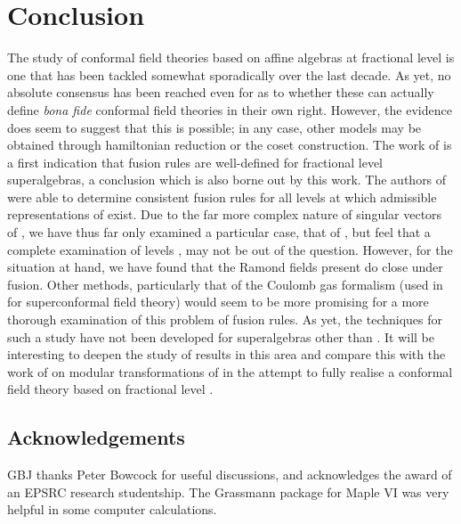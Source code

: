 \documentclass[a4paper,12pt]{article}
\def\N           {\mathbb N}
\def\hslc        {\hat{sl}(2|1;{\mathbb C})}
\def\hslck       {\hat{sl}(2|1;{\mathbb C})_k}
\def\hf          {\tfrac{1}{2}}
\begin{document}
\section{Conclusion}

The study of conformal field theories based on affine algebras at
fractional level is one that has been tackled somewhat sporadically
over the last decade.  As yet, no absolute consensus has been reached
even for \coordHE{} as to whether these can actually define {\em bona
fide} conformal field theories in their own right.  However, the   
evidence does seem to suggest that this is possible; in any case, 
other models may be obtained through hamiltonian reduction or the
coset construction.  The work of \cite{ER} is a first indication that
fusion rules are well-defined for fractional level superalgebras, a
conclusion which is also borne out by this work.  The authors of
\cite{ER} were able to determine consistent fusion rules for all
levels at which admissible representations of \coordHE{}
exist.  Due to the far more complex nature of singular vectors of
\myHighlight{$\hslck$}\coordHE{}, we have thus far only examined a particular case, that of
\myHighlight{$k=-\hf$}\coordHE{}, but feel that a complete examination of levels \coordHE{},
\myHighlight{$u \in \N \setminus \{1\}$}\coordHE{} may not be out of the question.  However, for
the situation at
hand, we have found that the Ramond fields present do close under
fusion.  Other methods, particularly that of the Coulomb gas formalism 
(used in \cite{MSS} for \coordHE{} superconformal field theory) would seem to 
be more promising for a more thorough examination of this problem of fusion 
rules.  As yet, the techniques for such a study have not been developed for 
superalgebras other than \coordHE{} \cite{Ras}.
It will be interesting to deepen the study of results in
this area and compare this with the work of \cite{GBJ} on modular
transformations of \myHighlight{$\hslck$}\coordHE{} in the attempt to fully realise a conformal
field theory based on fractional level \myHighlight{$\hslc$}\coordHE{}.


\subsection*{Acknowledgements}

GBJ thanks Peter Bowcock for useful discussions, and acknowledges the award 
of an EPSRC research studentship.  The Grassmann package for Maple VI 
\cite{CT} was very helpful in some computer calculations.
\end{document}
